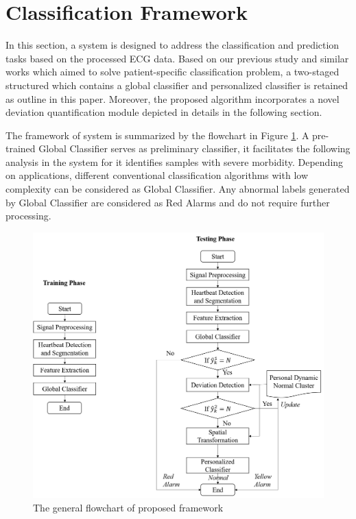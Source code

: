 \section{Classification Framework}

In this section, a system is designed to address the classification and prediction tasks based on the processed ECG data. Based on our previous study and similar works which aimed to solve patient-specific classification problem, a two-staged structured which contains a global classifier and personalized classifier is retained as outline in this paper\cite{chen2018predictive,Hu_et_al,deChazal2006,llamedo2012automatic}. Moreover, the proposed algorithm incorporates a novel deviation quantification module depicted in details in the following section. 

The framework of system is summarized by the flowchart in Figure \ref{fig:flow}. A pre-trained Global Classifier serves as preliminary classifier, it facilitates the following analysis in the system for it identifies samples with severe morbidity. Depending on applications, different conventional classification algorithms with low complexity can be considered as Global Classifier. Any abnormal labels generated by Global Classifier are considered as Red Alarms and do not require further processing.

\begin{figure}[ht]
	\centering
	\includegraphics[scale=.5]{Fig/flow2.png}
	\caption{The general flowchart of proposed framework}
	\label{fig:flow}
\end{figure}

